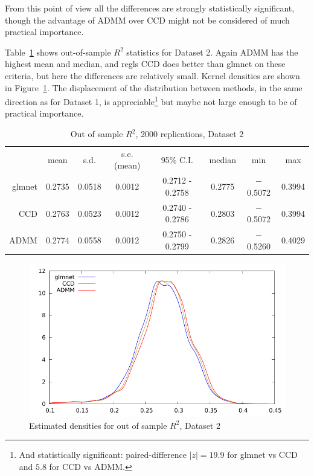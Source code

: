 \documentclass{article}
\begin{document}
From this point of view all the differences are strongly statistically
significant, though the advantage of ADMM over CCD might not be
considered of much practical importance.


Table~\ref{tab:dset2} shows out-of-sample $R^2$ statistics for Dataset
2. Again ADMM has the highest mean and median, and regls CCD does
better than glmnet on these criteria, but here the differences are
relatively small. Kernel densities are shown in
Figure~\ref{fig:dset2}. The displacement of the distribution between
methods, in the same direction as for Dataset 1, is
appreciable\footnote{And statistically significant: paired-difference
  $|z| = 19.9$ for glmnet vs CCD and $5.8$ for CCD vs ADMM.} but
maybe not large enough to be of practical importance.

\begin{table}[htbp]
  \centering
  \begin{tabular}{rccccccc}
 & mean & s.d. & s.e.(mean) & 95\% C.I. & median & min & max \\
      glmnet & 0.2735 & 0.0518 & 0.0012 & 0.2712 - 0.2758 & 0.2775 & $-$0.5072 & 0.3994 \\
         CCD & 0.2763 & 0.0523 & 0.0012 & 0.2740 - 0.2786 & 0.2803 & $-$0.5072 & 0.3994 \\
        ADMM & 0.2774 & 0.0558 & 0.0012 & 0.2750 - 0.2799 & 0.2826 & $-$0.5260 & 0.4029 \\
  \end{tabular}
  \caption{Out of sample $R^2$, 2000 replications, Dataset 2}
  \label{tab:dset2}
\end{table}

\begin{figure}[htbp]
  \centering
  \includegraphics[scale=0.9]{wine_kd3.pdf}
  \caption{Estimated densities for out of sample $R^2$, Dataset 2}
  \label{fig:dset2}
\end{figure}
\end{document}

